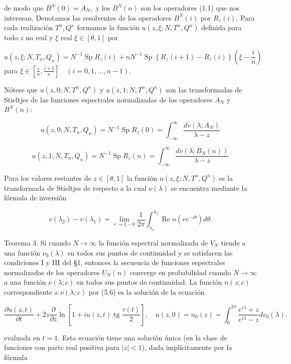 \documentclass[11pt,a4paper]{article}
\begin{document}
de modo que $B^N(0) = A_N,$ y los $B^N(n)$ son los operadores (1.1) que nos interesan. Denotamos las resolventes de los operadores $B^N(i)$ por $R_z(i).$ Para cada realización $T^n, Q^n$ formamos la función $u(z, \xi; N, T^n, Q^n)$ definida para todo $z$ no real y $\xi$ real $\xi \in [\theta, 1]$ por

$$u(z, \xi; N, T_n, Q_n) = N^{-1} \operatorname{Sp} R_z(i) + nN^{-1} \operatorname{Sp} \left\{R_z(i+1) - R_z(i)\right\} \left(\xi - \frac{i}{n}\right) \tag{3.2}$$
para $\xi \in \left[\frac{i}{n}, \frac{i+1}{n}\right] \quad (i = 0, 1, ..., n-1).$

Nótese que $u(z, 0; N, T^n, Q^n)$ y $u(z, 1; N, T^n, Q^n)$ son las transformadas de Stieltjes de las funciones espectrales normalizadas de los operadores $A_N$ y $B^N(n):$

$$u(z, 0; N, T_n, Q_n) = N^{-1} \operatorname{Sp} R_z(0) = \int_{-\infty}^{\infty} \frac{dv(\lambda; A_N)}{\lambda - z} \tag{3.3}$$

$$u(z, 1; N, T_n, Q_n) = N^{-1} \operatorname{Sp} R_z(n) = \int_{-\infty}^{\infty} \frac{dv(\lambda; B_N(n))}{\lambda - z} \tag{3.3'}$$

Para los valores restantes de $z \in [\theta, 1]$ la función $u(z, \xi; N, T^n, Q^n)$ es la transformada de Stieltjes de respecto a la cual $\nu(\lambda)$ se encuentra mediante la fórmula de inversión

$$v(\lambda_2) - v(\lambda_1) = \lim_{r \to 1-0} \frac{1}{2\pi} \int_{\lambda_1}^{\lambda_2} \operatorname{Re} n(re^{-i\theta}) d\theta.$$

Teorema 3. Si cuando $N \to \infty$ la función espectral normalizada de $V_N$ tiende a una función $\nu_0(\lambda)$ en todos sus puntos de continuidad y se satisfacen las condiciones I y III del \S 1, entonces la secuencia de funciones espectrales normalizadas de los operadores $U_N(n)$ converge en probabilidad cuando $N \to \infty$ a una función $\nu(\lambda; c)$ en todos sus puntos de continuidad. La función $n(z; c)$ correspondiente a $\nu(\lambda; c)$ por (5.6) es la solución de la ecuación

$$\frac{\partial u(z,t)}{\partial t} + 2z \frac{\partial}{\partial z} \ln \left[ 1 + iu(z,t) \operatorname{tg} \frac{\tau(t)}{2} \right], \quad u(z,0) = n_0(z) = \int_0^{2\pi} \frac{e^{i\lambda} + z}{e^{i\lambda} - z} dv_0(\lambda).$$

evaluada en $t = 1$. Esta ecuación tiene una solución única (en la clase de funciones con parte real positiva para $|z| < 1$), dada implícitamente por la fórmula
\end{document}
